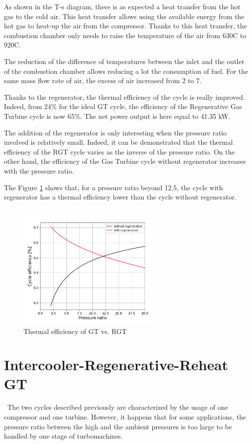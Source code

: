 As shown in the T-s diagram, there is as expected a heat transfer from the hot gas to the cold air. This heat transfer allows using the available energy from the hot gas to heat-up the air from the compressor. Thanks to this heat transfer, the combustion chamber only needs to raise the temperature of the air from 630\degree C to 920\degree C. 

The reduction of the difference of temperatures between the inlet and the outlet of the combustion chamber allows reducing a lot the consumption of fuel. For the same mass flow rate of air, the excess of air increased from 2 to 7.   

Thanks to the regenerator, the thermal efficiency of the cycle is really improved. Indeed, from 24\% for the ideal GT cycle, the efficiency of the Regenerative Gas Turbine cycle is now 65\%. The net power output is here equal to 41.35 kW.

The addition of the regenerator is only interesting when the pressure ratio involved is relatively small. Indeed, it can be demonstrated that the thermal efficiency of the RGT cycle varies as the inverse of the pressure ratio. On the other hand, the efficiency of the Gas Turbine cycle without regenerator increases with the pressure ratio. 

The Figure \ref{fig:C5_eff_RGT-GT} shows that, for a pressure ratio beyond 12.5, the cycle with regenerator has a thermal efficiency lower than the cycle without regenerator. 

\begin{figure}[h]
    \centering
    \includegraphics[width=0.65\textwidth]{Chapitre_5/Images/Efficiency_ideal_Brayton_regen.png}
    \caption{Thermal efficiency of GT vs. RGT}
    \label{fig:C5_eff_RGT-GT}
\end{figure}

\section{Intercooler-Regenerative-Reheat GT}
\quad\ The two cycles described previously are characterized by the usage of one compressor and one turbine. However, it happens that for some applications, the pressure ratio between the high and the ambient pressures is too large to be handled by one stage of turbomachines.

